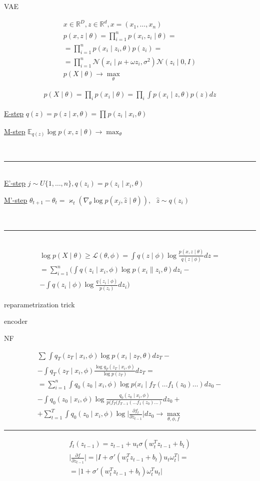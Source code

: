 \documentclass{book}
\begin{document}
VAE

\begin{gather*}
    x\in \mathbb{R}^D, z\in \mathbb{R}^d, x=(x_1,\dots,x_n)\\
    p(x,z\mid \theta)=\prod_{i=1}^{n} {p(x_i,z_i\mid \theta)}=\\
    =\prod_{i=1}^{n} {p(x_i\mid z_i,\theta)p(z_i)}=\\
    =\prod_{i=1}^{n} {\mathcal{N}(x_i\mid \mu+\omega z_i,\sigma^2)\mathcal{N}(z_i\mid 0,I)}\\
    p(X\mid \theta)\rightarrow\max_\theta
\end{gather*}

\begin{gather*}
    p(X\mid \theta)=\prod_{i}^{} {p(x_i\mid \theta)}=\prod_i {\int {p(x_i\mid z,\theta)p(z)dz}}
\end{gather*}

\underline{E-step} $q(z)=p(z\mid x,\theta)=\prod_{}^{} {p(z_i\mid x_i,\theta)}$

\underline{M-step} $\mathbb{E}_{q(z)}\log p(x,z\mid \theta)\rightarrow\max_\theta$ 

~\\\hrule~\\

\underline{E'-step} $j\sim U\{1,\dots,n\}, q(z_i)=p(z_i\mid x_i,\theta)$

\underline{M'-step} $\theta_{t+1}-\theta_t=\varkappa_t(\nabla_\theta\log p(x_j,\hat{z}\mid \theta)),~~~\hat{z}\sim q(z_i)$

~\\\hrule~\\

\begin{gather*}
    \log p(X\mid \theta)\geq \mathcal{L}(\theta,\phi)=\int {q(z\mid \phi)\log \frac{p(x,z\mid \theta)}{q(z\mid \phi)}dz}=\\
    =\sum_{i=1}^{n} \Bigg(\int {q(z_i\mid x_i,\phi)\log p(x_i\|z_i,\theta)dz_i}-\\
    -\int {q(z_i\mid \phi)\log\frac{q(z_i\mid \phi)}{p(z_i)}dz_i}\Bigg)
\end{gather*}

reparametrization trick

encoder

NF

\begin{gather*}
    \sum_{}^{} \int {q_T(z_T\mid x_i,\phi)\log p(x_i\mid z_T,\theta)dz_T}-\\
    -\int {q_T(z_T\mid x_i,\phi)\frac{\log q_T(z_T\mid x_i,\phi)}{\log p(z_T)}dz_T}=\\
    =\sum_{i=1}^{n} \int {q_0(z_0\mid x_i,\phi)\log p(x_i\mid f_T(\dots f_1(z_0)\dots)dz_0}-\\
    -\int {q_0(z_0\mid x_i,\phi)\log\frac{q_0(z_0\mid x_i,\phi)}{p(f_T(f_{T-1}(\dots f_1(z_0)\dots)}dz_0}+\\
    +\sum_{t=1}^{T} {\int {q_0(z_0\mid x_i,\phi)\log\Bigg|\frac{\partial f_t}{\partial z_{t-1}}\Bigg|}dz_0} \rightarrow\max_{\theta,\phi,f}
\end{gather*}

\hrule

\begin{gather*}
    f_t(z_{t-1})=z_{t-1}+u_t\sigma(w_t^Tz_{t-1}+b_t)\\
    \Bigg| \frac{\partial f}{\partial z_{t-1}}\Bigg| =\Bigg|I+\sigma'(w_t^Tz_{t-1}+b_t)u_t\omega_t^T\Bigg|=\\
    =\Bigg|1+\sigma'(w_t^Tz_{t-1}+b_t)\omega_t^Tu_t\Bigg|
\end{gather*}
\end{document}
